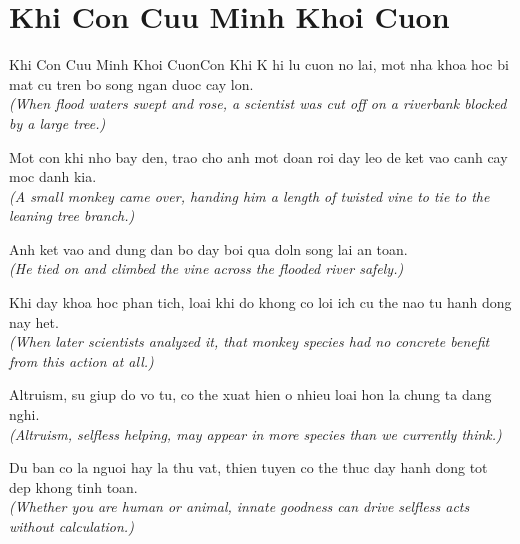 \section{Khi Con Cuu Minh Khoi Cuon}
\begin{truyen}{Khi Con Cuu Minh Khoi Cuon}{Con Khi}
K hi lu cuon no lai, mot nha khoa hoc bi mat cu tren bo song ngan duoc cay lon.\\
\textit{(When flood waters swept and rose, a scientist was cut off on a riverbank blocked by a large tree.)}

Mot con khi nho bay den, trao cho anh mot doan roi day leo de ket vao canh cay moc danh kia.\\
\textit{(A small monkey came over, handing him a length of twisted vine to tie to the leaning tree branch.)}

Anh ket vao and dung dan bo day boi qua doln song lai an toan.\\
\textit{(He tied on and climbed the vine across the flooded river safely.)}

Khi day khoa hoc phan tich, loai khi do khong co loi ich cu the nao tu hanh dong nay het.\\
\textit{(When later scientists analyzed it, that monkey species had no concrete benefit from this action at all.)}

Altruism, su giup do vo tu, co the xuat hien o nhieu loai hon la chung ta dang nghi.\\
\textit{(Altruism, selfless helping, may appear in more species than we currently think.)}

\end{truyen}
\begin{baihoc}
  Du ban co la nguoi hay la thu vat, thien tuyen co the thuc day hanh dong tot dep khong tinh toan.\\
  \textit{(Whether you are human or animal, innate goodness can drive selfless acts without calculation.)}
\end{baihoc}

